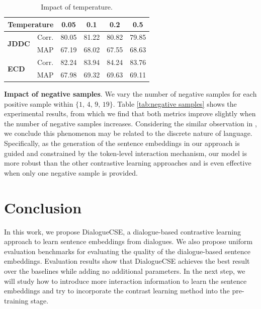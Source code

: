\documentclass[11pt]{article}
\begin{document}
\begin{table}[tb]
    \centering
    \small
    \begin{tabular}{lc|cccc}
        \toprule
        \multicolumn{2}{c|}{\textbf{Temperature}} & \textbf{0.05} & \textbf{0.1} & \textbf{0.2}  & \textbf{0.5} \\
        \midrule
        \multirow{2}{*}{\textbf{JDDC}} & Corr. & 80.05  &  81.22  &  80.82  &  79.85   \\
                                       & MAP   & 67.19  &  68.02  &  67.55  &  68.63    \\
        \midrule
        \multirow{2}{*}{\textbf{ECD}} & Corr.  & 82.24  &  83.94  &  84.24  &  83.76       \\
                                      & MAP    & 67.98  &  69.32  &  69.63  &  69.11       \\
        \bottomrule
    \end{tabular}
    \caption{Impact of temperature.}
    \label{tab:hyper-parameter}
\end{table}

{\textbf{Impact of negative samples}}.
We vary the number of negative samples for each positive sample within $\{\text{1, 4, 9, 19}\}$.
Table \ref{tab:negative samples} shows the experimental results, from which we find that both metrics improve slightly when the number of negative samples increases.
Considering the similar observation in \cite{gao2021simcse, yan2021consert}, we conclude this phenomenon may be related to the discrete nature of language.
Specifically, as the generation of the sentence embeddings in our approach is guided and constrained by the token-level interaction mechanism, our model is more robust than the other contrastive learning approaches and is even effective when only one negative sample is provided.

\section{Conclusion}
In this work, we propose DialogueCSE, a dialogue-based contrastive learning approach to learn sentence embeddings from dialogues.
We also propose uniform evaluation benchmarks for evaluating the quality of the dialogue-based sentence embeddings. 
Evaluation results show that DialogueCSE achieves the best result over the baselines while adding no additional parameters.
In the next step, we will study how to introduce more interaction information to learn the sentence embeddings and try to incorporate the contrast learning method into the pre-training stage.
\end{document}
